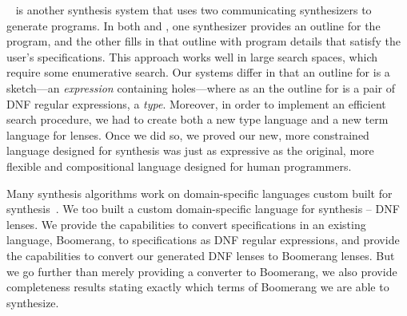 \documentclass[acmsmall]{acmart}
\begin{document}
\Morpheus{}~\cite{morpheus} is another synthesis system that uses two
communicating synthesizers to generate programs.  In both \Morpheus{} and
\Optician{}, one synthesizer provides an 
outline for the program, and the other fills in that outline with program
details that satisfy the user's specifications.
This approach works well in large search spaces, which
require some enumerative search.
Our systems differ in that an outline for \Morpheus{} is a sketch---an 
\emph{expression}
containing holes---where as
an the outline for \Optician{} is a pair of DNF regular expressions, a 
\emph{type}.  Moreover, in order to implement an efficient
search procedure, we had to create both a new type language and a new
term language for lenses.  Once we did so, we proved our new, more
constrained language
designed for synthesis was just as expressive as the original, more
flexible and compositional language designed for human programmers.

Many synthesis algorithms work on domain-specific
languages custom built for
synthesis~\cite{flashfill,le-pldi-2014,solar-lezama-thesis-2008,yag+:pldi16}.  We
too built a custom domain-specific 
language for synthesis -- DNF lenses.  We provide the capabilities to
convert specifications in an existing language, Boomerang, to specifications as
DNF regular expressions, and provide the 
capabilities to convert our generated DNF lenses to Boomerang lenses.
But we go further than merely providing a converter to Boomerang, we also
provide completeness results stating exactly which terms of Boomerang we are
able to synthesize. 
\end{document}
